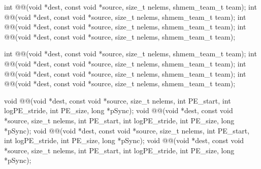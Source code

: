 
\begin{apidefinition}

{\color{Green}
\begin{C11synopsis}
int @@(void *dest, const void *source, size_t nelems, shmem_team_t team);
int @@(void *dest, const void *source, size_t nelems, shmem_team_t team);
int @@(void *dest, const void *source, size_t nelems, shmem_team_t team);
int @@(void *dest, const void *source, size_t nelems, shmem_team_t team);
\end{C11synopsis}
}

\begin{Csynopsis}
\end{Csynopsis}
{\color{Green}
\begin{CsynopsisCol}
int @@(void *dest, const void *source, size_t nelems, shmem_team_t team);
int @@(void *dest, const void *source, size_t nelems, shmem_team_t team);
int @@(void *dest, const void *source, size_t nelems, shmem_team_t team);
int @@(void *dest, const void *source, size_t nelems, shmem_team_t team);
\end{CsynopsisCol}
}
\begin{DeprecateBlock}
\begin{CsynopsisCol}
void @@(void *dest, const void *source, size_t nelems, int PE_start, int logPE_stride, int PE_size, long *pSync);
void @@(void *dest, const void *source, size_t nelems, int PE_start, int logPE_stride, int PE_size, long *pSync);
void @@(void *dest, const void *source, size_t nelems, int PE_start, int logPE_stride, int PE_size, long *pSync);
void @@(void *dest, const void *source, size_t nelems, int PE_start, int logPE_stride, int PE_size, long *pSync);
\end{CsynopsisCol}
\end{DeprecateBlock}


\end{apidefinition}
